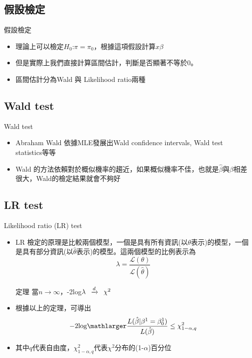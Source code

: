 \documentclass[border=10pt]{beamer}
\begin{document}
\subsection{假設檢定}
\begin{frame}{假設檢定}
\begin{itemize} 
\item 理論上可以檢定$\textit{H}_{0}$:\hspace{.6em}$\pi=\pi_{0}$，根據這項假設計算$x\beta$
\item 但是實際上我們直接計算區間估計，判斷是否顯著不等於0。
\item 區間估計分為Wald 與 Likelihood ratio兩種
\end{itemize}
\end{frame}

\subsection{Wald test}
\begin{frame}{Wald test}
\begin{itemize} 
\item Abraham Wald 依據MLE發展出Wald confidence intervals, Wald test statistics等等
\item Wald 的方法依賴對於概似機率的趨近，如果概似機率不佳，也就是$\hat{\beta}$與$\beta$相差很大，Wald的檢定結果就會不夠好
\end{itemize}
\end{frame}
\subsection{LR test}
\begin{frame}{Likelihood ratio (LR) test}
\begin{itemize} 
\item LR 檢定的原理是比較兩個模型，一個是具有所有資訊(以$\theta$表示)的模型，一個是具有部分資訊(以$\hat{\theta}$表示)的模型。這兩個模型的比例表示為
\[\lambda=\frac{\mathcal{L}(\theta)}{\mathcal{L}(\hat{\theta})} \]
\begin{exampleblock}{定理}
當$n\longrightarrow \infty$，-2log$\lambda\hspace{.5em}\xrightarrow{d}\hspace{.5em}\chi^2$
\end{exampleblock}
\item 根據以上的定理，可導出
\[-2\text{log}\mathlarger\frac{L(\hat{\beta}|\beta^{1}=\beta^{1}_{0})}{L(\hat{\beta})}\leq \chi^2_{1-\alpha, q} \]
\item 其中$q$代表自由度，$\chi^2_{1-\alpha, q}$代表$\chi^2$分布的(1-$\alpha$)百分位
\end{itemize}
\end{frame}
\end{document}
